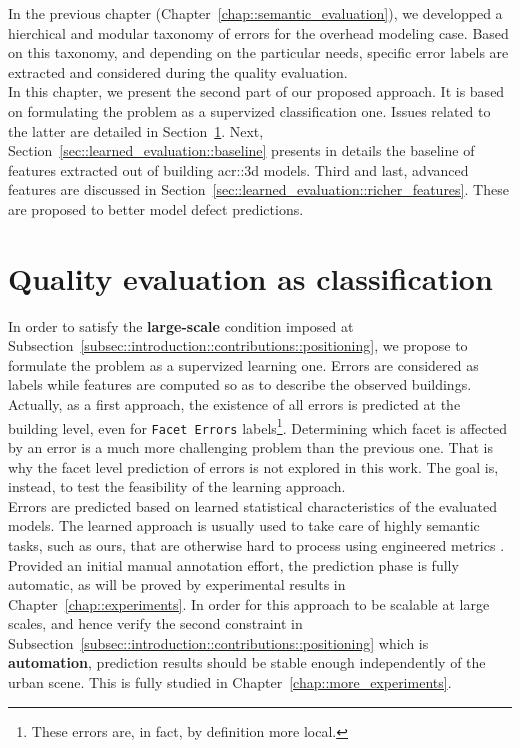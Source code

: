 \minitoc

\vfill

In the previous chapter (Chapter~\ref{chap::semantic_evaluation}), we developped a hierchical and modular taxonomy of errors for the overhead modeling case.
Based on this taxonomy, and depending on the particular needs, specific error labels are extracted and considered during the quality evaluation.\\
In this chapter, we present the second part of our proposed approach.
It is based on formulating the problem as a supervized classification one.
Issues related to the latter are detailed in Section~\ref{sec::learned_evaluation::classification}.
Next, Section~\ref{sec::learned_evaluation::baseline} presents in details the baseline of features extracted out of building \gls{acr::3d} models.
Third and last, advanced features are discussed in Section~\ref{sec::learned_evaluation::richer_features}.
These are proposed to better model defect predictions.

\clearpage

\section{Quality evaluation as classification}
    \label{sec::learned_evaluation::classification}
    In order to satisfy the \textbf{large-scale} condition imposed at Subsection~\ref{subsec::introduction::contributions::positioning}, we propose to formulate the problem as a supervized learning one.
    Errors are considered as labels while features are computed so as to describe the observed buildings.
    Actually, as a first approach, the existence of all errors is predicted at the building level, even for \texttt{Facet Errors} labels\footnote{These errors are, in fact, by definition more local.}.
    Determining which facet is affected by an error is a much more challenging problem than the previous one.
    That is why the facet level prediction of errors is not explored in this work.
    The goal is, instead, to test the feasibility of the learning approach.\\

    Errors are predicted based on learned statistical characteristics of the evaluated models.
    The learned approach is usually used to take care of highly semantic tasks, such as ours, that are otherwise hard to process using engineered metrics \addref.\\
    Provided an initial manual annotation effort, the prediction phase is fully automatic, as will be proved by experimental results in Chapter~\ref{chap::experiments}.
    In order for this approach to be scalable at large scales, and hence verify the second constraint in Subsection~\ref{subsec::introduction::contributions::positioning} which is \textbf{automation}, prediction results should be stable enough independently of the urban scene.
    This is fully studied in Chapter~\ref{chap::more_experiments}.\\

